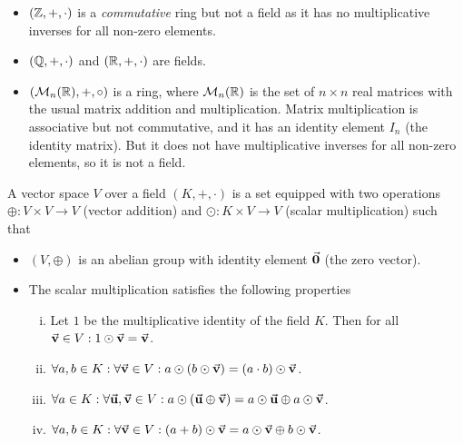 \begin{itemize}
    \item \((\mathbb Z, +, \cdot)\) is a \emph{commutative} ring but not a field as it has no multiplicative inverses for all non-zero elements.
    \item \((\mathbb Q, +, \cdot)\) and \((\mathbb R, +, \cdot)\) are fields.
    \item \((\mathcal M_{n}(\mathbb R), +, \circ)\) is a ring, where \(\mathcal M_{n}(\mathbb R)\) is the set of \(n \times n\) real matrices with the usual matrix addition and multiplication. Matrix multiplication is associative but not commutative, and it has an identity element \(I_n\) (the identity matrix). But it does not have multiplicative inverses for all non-zero elements, so it is not a field.
\end{itemize}

\begin{definition}
    A vector space \(V\) over a field \((K, +, \cdot)\) is a set equipped with two operations \(\oplus: V \times V \to V\) (vector addition) and \(\odot: K \times V \to V\) (scalar multiplication) such that
    \begin{itemize}
        \item \((V, \oplus)\) is an abelian group with identity element \(\va{0}\) (the zero vector).
        \item The scalar multiplication satisfies the following properties
              \begin{enumerate}[(i)]
                  \item Let \(1\) be the multiplicative identity of the field \(K\). Then for all \(\va{v} \in V: 1 \odot \va{v} = \va{v}\).
                  \item \(\forall a, b \in K: \forall \va{v} \in V: a \odot (b \odot \va{v}) = (a \cdot b) \odot \va{v}\).
                  \item \(\forall a \in K: \forall \va{u}, \va{v} \in V: a \odot (\va{u} \oplus \va{v}) = a \odot \va{u} \oplus a \odot \va{v}\).
                  \item \(\forall a, b \in K: \forall \va{v} \in V: (a + b) \odot \va{v} = a \odot \va{v} \oplus b \odot \va{v}\).
              \end{enumerate}
    \end{itemize}
\end{definition}
